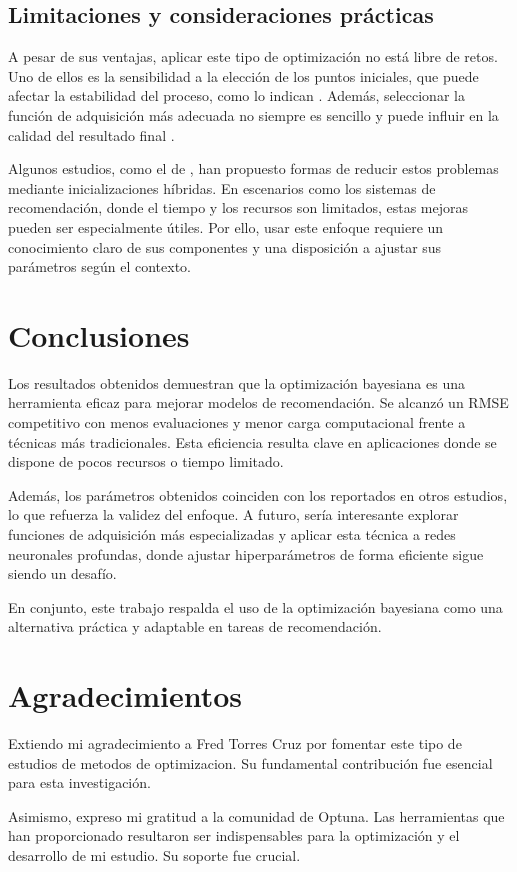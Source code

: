 \documentclass[twocolumn,10pt]{article}
\begin{document}
\subsection{Limitaciones y consideraciones prácticas}

A pesar de sus ventajas, aplicar este tipo de optimización no está libre de retos. Uno de ellos es la sensibilidad a la elección de los puntos iniciales, que puede afectar la estabilidad del proceso, como lo indican \citet{wu2019practical}. Además, seleccionar la función de adquisición más adecuada no siempre es sencillo y puede influir en la calidad del resultado final \citep{brochu2010tutorial}.

Algunos estudios, como el de \citet{wang2020new}, han propuesto formas de reducir estos problemas mediante inicializaciones híbridas. En escenarios como los sistemas de recomendación, donde el tiempo y los recursos son limitados, estas mejoras pueden ser especialmente útiles. Por ello, usar este enfoque requiere un conocimiento claro de sus componentes y una disposición a ajustar sus parámetros según el contexto.

\section{Conclusiones}

Los resultados obtenidos demuestran que la optimización bayesiana es una herramienta eficaz para mejorar modelos de recomendación. Se alcanzó un RMSE competitivo con menos evaluaciones y menor carga computacional frente a técnicas más tradicionales. Esta eficiencia resulta clave en aplicaciones donde se dispone de pocos recursos o tiempo limitado.

Además, los parámetros obtenidos coinciden con los reportados en otros estudios, lo que refuerza la validez del enfoque. A futuro, sería interesante explorar funciones de adquisición más especializadas y aplicar esta técnica a redes neuronales profundas, donde ajustar hiperparámetros de forma eficiente sigue siendo un desafío.

En conjunto, este trabajo respalda el uso de la optimización bayesiana como una alternativa práctica y adaptable en tareas de recomendación.


\section*{Agradecimientos}

Extiendo mi agradecimiento a Fred Torres Cruz por fomentar este tipo de estudios de metodos de optimizacion. Su fundamental contribución fue esencial para esta investigación.

Asimismo, expreso mi gratitud a la comunidad de Optuna. Las herramientas que han proporcionado resultaron ser indispensables para la optimización y el desarrollo de mi estudio. Su soporte fue crucial.


\end{document}
